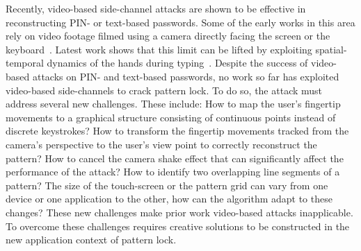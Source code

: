 Recently, video-based side-channel attacks are shown to be effective in reconstructing PIN- or
text-based passwords. Some of the early works in this area rely on video
footage filmed using a camera directly facing the screen or the keyboard~\cite{
kuhn2002compromising, balzarotti2008clearshot}. Latest work shows that
this limit can be lifted by exploiting spatial-temporal dynamics of
the hands during typing~\cite{shukla2014beware}.
Despite the success of
video-based attacks on PIN- and text-based passwords, no work so far has
exploited video-based side-channels to crack pattern lock.
To do so, the attack must address several new challenges. These include: How to map the user's fingertip
movements to a graphical structure consisting of continuous points instead of discrete
keystrokes? How to transform the fingertip movements tracked from
the camera's perspective to the user's view point to correctly reconstruct the
pattern? How to cancel the camera shake effect that can significantly
affect the performance of the attack? How to identify two overlapping line segments
of a pattern? The size of the touch-screen or the pattern grid
can vary from one device or one application to the other, how can the algorithm
adapt to these changes?
These new challenges make prior work video-based attacks inapplicable.
To overcome these challenges requires creative
solutions to be constructed in the new application context of pattern lock.



